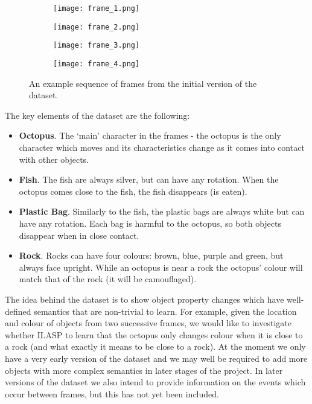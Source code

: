 \documentclass[../interim.tex]{subfiles}
\begin{document}
\begin{figure}[ht!]
  \begin{subfigure}{0.24\textwidth}
    \centering
    \texttt{[image: frame\_1.png]}
  \end{subfigure}
  \hfill
  \begin{subfigure}{0.24\textwidth}
    \centering
    \texttt{[image: frame\_2.png]}
  \end{subfigure}
  \hfill
  \begin{subfigure}{0.24\textwidth}
    \centering
    \texttt{[image: frame\_3.png]}
  \end{subfigure}
  \hfill
  \begin{subfigure}{0.24\textwidth}
    \centering
    \texttt{[image: frame\_4.png]}
  \end{subfigure}
  \caption{An example sequence of frames from the initial version of the dataset.}
  \label{fig:dataset-frames}
\end{figure}

The key elements of the dataset are the following:
\begin{itemize}
  \item \textbf{Octopus}. The `main' character in the frames - the octopus is the only character which moves and its characteristics change as it comes into contact with other objects.

  \item \textbf{Fish}. The fish are always silver, but can have any rotation. When the octopus comes close to the fish, the fish disappears (is eaten).

  \item \textbf{Plastic Bag}. Similarly to the fish, the plastic bags are always white but can have any rotation. Each bag is harmful to the octopus, so both objects disappear when in close contact.

  \item \textbf{Rock}. Rocks can have four colours: brown, blue, purple and green, but always face upright. While an octopus is near a rock the octopus' colour will match that of the rock (it will be camouflaged).
\end{itemize}

The idea behind the dataset is to show object property changes which have well-defined semantics that are non-trivial to learn. For example, given the location and colour of objects from two successive frames, we would like to investigate whether ILASP to learn that the octopus only changes colour when it is close to a rock (and what exactly it means to be close to a rock). At the moment we only have a very early version of the dataset and we may well be required to add more objects with more complex semantics in later stages of the project. In later versions of the dataset we also intend to provide information on the events which occur between frames, but this has not yet been included.
\end{document}
